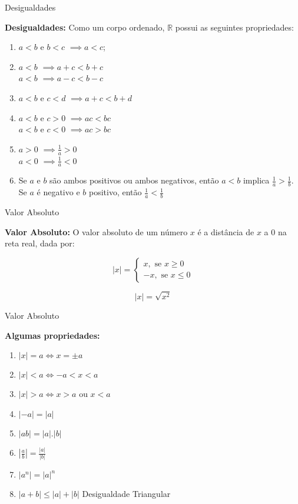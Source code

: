 \documentclass[hyperref={pdfpagelabels=false}]{beamer}
\begin{document}
\begin{frame}{Desigualdades}
 
 \textbf{Desigualdades:} Como um corpo ordenado, $\mathbb{R}$ possui as seguintes propriedades:
\begin{enumerate}
	\item $a<b$ e $b<c$ $\implies a<c$; \pause
	\item $a<b$ $\implies a+c<b+c$ \\ $a<b$ $\implies a-c<b-c$ \pause
	\item $a<b$ e $c<d$ $\implies a+c<b+d$ \pause
	\item $a<b$ e $c>0$ $\implies ac<bc$ \\ $a<b$ e $c<0$ $\implies ac>bc$ \pause
	\item $a>0$ $\implies \frac{1}{a}>0$ \\ $a<0$ $\implies \frac{1}{a}<0$ \pause
	\item Se $a$ e $b$ são ambos positivos ou ambos negativos, então $a<b$ implica $\displaystyle \frac{1}{a} > \displaystyle \frac{1}{b}$. Se $a$ é negativo e $b$ positivo, então $\displaystyle \frac{1}{a} < \displaystyle \frac{1}{b}$
\end{enumerate}
 
\end{frame}

\begin{frame}{Valor Absoluto}
 
\textbf{Valor Absoluto:} O valor absoluto de um número $x$ é a distância de $x$ a $0$ na reta real, dada por:

$$|x| = 
\begin{cases}
x, \text{  se } x \geq 0 \\
-x, \text{ se } x \leq 0
\end{cases}
$$

$$|x| = \sqrt{x^{2}} $$

 
\end{frame}

\begin{frame}{Valor Absoluto}
 
 {\bf Algumas propriedades:}
\begin{enumerate}
	\item $|x| = a \Leftrightarrow x = \pm a$ \pause
	\item $|x| < a \Leftrightarrow -a < x < a$ \pause
	\item $|x| > a \Leftrightarrow x>a$ ou $x<a$ \pause
	\item $|-a| = |a|$ \pause
	\item $|ab|=|a|.|b|$ \pause 
	\item $|\frac{a}{b}| = \frac{|a|}{|b|}$ \pause
	\item $|a^{n}| = |a|^{n}$ \pause
	\item $|a+b| \leq |a| + |b|$ Desigualdade Triangular
\end{enumerate}
 
\end{frame}
\end{document}

